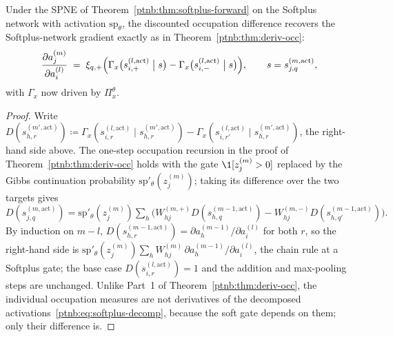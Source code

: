 \begin{theoremenv}\label{ptnb:thm:softplus-gradient}
Under the SPNE of Theorem~\ref{ptnb:thm:softplus-forward} on the Softplus network with activation
$\mathrm{sp}_\theta$, the discounted occupation difference recovers the Softplus-network gradient
exactly as in Theorem~\ref{ptnb:thm:deriv-occ}:
\begin{align}
    \frac{\partial a_j^{(m)}}{\partial a_i^{(l)}}
    \;=\;
    \xi_{q,+}\Bigl(\Gamma_x\bigl(s_{i,+}^{(l, \mathrm{act})} \bigm| s\bigr) -
    \Gamma_x\bigl(s_{i,-}^{(l, \mathrm{act})} \bigm| s\bigr)\Bigr),
    \qquad s = s_{j,q}^{(m, \mathrm{act})},
\end{align}
with $\Gamma_x$ now driven by $\Pi_x^\theta$.
\hfill{}
\end{theoremenv}

\begin{proof}
Write $D(s_{h,r}^{(m',\mathrm{act})}) \coloneqq \Gamma_x(s_{i,r}^{(l,\mathrm{act})} \mid
    s_{h,r}^{(m',\mathrm{act})}) - \Gamma_x(s_{i,r'}^{(l,\mathrm{act})} \mid
    s_{h,r}^{(m',\mathrm{act})})$, the right-hand side above. The one-step occupation recursion in the
proof of Theorem~\ref{ptnb:thm:deriv-occ} holds with the gate $\1[z_j^{(m)} > 0]$ replaced by the Gibbs
continuation probability $\mathrm{sp}'_\theta(z_j^{(m)})$; taking its difference over the two
targets gives
\(
    D(s_{j,q}^{(m,\mathrm{act})}) = \mathrm{sp}'_\theta(z_j^{(m)}) \sum_h \bigl( W_{hj}^{(m,+)}
    D(s_{h,q}^{(m-1,\mathrm{act})}) - W_{hj}^{(m,-)} D(s_{h,q'}^{(m-1,\mathrm{act})}) \bigr).
\)
By induction on $m-l$, $D(s_{h,r}^{(m-1,\mathrm{act})}) = \partial a_h^{(m-1)}/\partial a_i^{(l)}$
for both $r$, so the right-hand side is $\mathrm{sp}'_\theta(z_j^{(m)}) \sum_h W_{hj}^{(m)}\,
    \partial a_h^{(m-1)}/\partial a_i^{(l)}$, the chain rule at a Softplus gate; the base case
$D(s_{i,r}^{(l,\mathrm{act})}) = 1$ and the addition and max-pooling steps are unchanged. Unlike
Part~1 of Theorem~\ref{ptnb:thm:deriv-occ}, the individual occupation measures are not derivatives of
the decomposed activations~\eqref{ptnb:eq:softplus-decomp}, because the soft gate depends on them; only
their difference is.
\end{proof}

